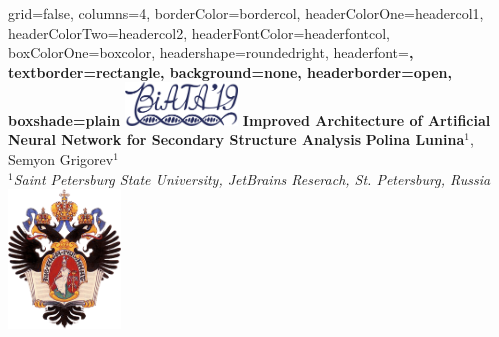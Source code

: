 \documentclass[a0paper,portrait]{baposter}
\begin{document}
\begin{poster}{
grid=false,
columns=4,
borderColor=bordercol, %
headerColorOne=headercol1, %
headerColorTwo=headercol2, %
headerFontColor=headerfontcol, %
boxColorOne=boxcolor, %
headershape=roundedright, %
headerfont=\Large\sf\bf, %
textborder=rectangle,
background=none,
headerborder=open, %
boxshade=plain
}
{\includegraphics[width=3cm]{BiATA2019.png}}
%
%
{ \bf  \huge {Improved Architecture of Artificial Neural Network for Secondary Structure Analysis} }  %
{\vspace{0.3em} \smaller \textbf{Polina Lunina$^1$}, Semyon Grigorev$^1$ \\  %
\smaller \it $^1${Saint Petersburg State University, JetBrains Reserach, St. Petersburg, Russia } \\ %
}
{\includegraphics[width=3cm]{SPbGU_Logo.png}} %


\end{poster}
\end{document}
